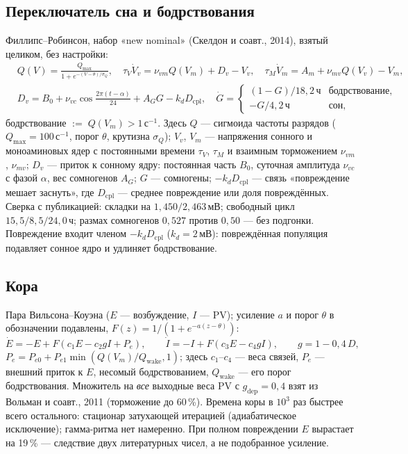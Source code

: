 \documentclass[11pt,a4paper]{article}
\theoremstyle{remark}
\begin{document}
\subsection{Переключатель сна и бодрствования}\label{sec:sleep}
Филлипс--Робинсон, набор «new nominal» (Скелдон и соавт., 2014), взятый целиком, без
настройки:
\begin{equation}\label{eq:pr}
\begin{aligned}
&Q(V)=\frac{Q_{\max}}{1+e^{-(V-\theta)/\sigma_Q}},\quad
\tau_V\dot V_v=\nu_{vm}Q(V_m)+D_v-V_v,\quad
\tau_M\dot V_m=A_m+\nu_{mv}Q(V_v)-V_m,\\
&D_v=B_0+\nu_{vc}\cos\tfrac{2\pi(t-\alpha)}{24}+A_G G-k_d D_{\mathrm{cpl}},\quad
\dot G=\begin{cases}(1-G)/18{,}2\,\mathrm{ч}&\text{бодрствование},\\-G/4{,}2\,\mathrm{ч}&\text{сон},\end{cases}
\end{aligned}
\end{equation}
бодрствование $:=\;Q(V_m)>1$\,с$^{-1}$. Здесь $Q$ --- сигмоида частоты разрядов
($Q_{\max}=100$\,с$^{-1}$, порог $\theta$, крутизна $\sigma_Q$); $V_v$, $V_m$ ---
напряжения сонного и моноаминовых ядер с постоянными времени $\tau_V$, $\tau_M$ и взаимным
торможением $\nu_{vm}$, $\nu_{mv}$;
$D_v$ --- приток к сонному ядру: постоянная часть $B_0$, суточная амплитуда $\nu_{vc}$
с фазой $\alpha$, вес сомногенов $A_G$; $G$ --- сомногены; $-k_d D_{\mathrm{cpl}}$
--- связь «повреждение мешает заснуть», где $D_{\mathrm{cpl}}$ --- среднее повреждение
или доля повреждённых. Сверка с публикацией: складки на
$1{,}450/2{,}463$\,мВ; свободный цикл
$15{,}5/8{,}5/24{,}0$\,ч; размах сомногенов $0{,}527$ против $0{,}50$ --- без
подгонки. Повреждение входит членом $-k_d D_{\mathrm{cpl}}$ ($k_d=2$\,мВ): повреждённая
популяция подавляет сонное ядро и удлиняет бодрствование.

\subsection{Кора}\label{sec:cortex}
Пара Вильсона--Коуэна ($E$ --- возбуждение, $I$ --- PV); усиление $a$ и порог $\theta$ в
обозначении подавлены, $F(z)=1/(1+e^{-a(z-\theta)})$:
\begin{equation}\label{eq:wc}
\dot E=-E+F(c_1E-c_2gI+P_e),\qquad
\dot I=-I+F(c_3E-c_4gI),\qquad
g=1-0{,}4\,D,
\end{equation}
$P_e=P_{e0}+P_{e1}\min(Q(V_m)/Q_{\mathrm{wake}},1)$; здесь $c_1$--$c_4$ --- веса
связей, $P_e$ --- внешний приток к $E$, несомый бодрствованием, $Q_{\mathrm{wake}}$
--- его порог бодрствования. Множитель на \emph{все} выходные
веса PV с $g_{\mathrm{dep}}=0{,}4$ взят из Вольман и соавт., 2011 (торможение до
60\,\%). Времена коры в $10^3$ раз быстрее всего остального: стационар затухающей
итерацией (адиабатическое исключение); гамма-ритма нет намеренно. При полном
повреждении $E$ вырастает на 19\,\% --- следствие двух литературных чисел, а не
подобранное усиление.
\end{document}
